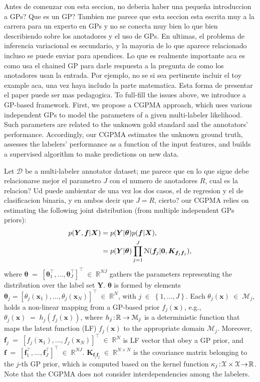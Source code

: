\documentclass[journal]{IEEEtran}
\providecommand{\ve}[1]{{\bm{#1}}}%
\providecommand{\mat}[1]{{\bm{#1}}} %
\newcommand{\Real}{\mathbb{R}}
\DeclareMathOperator{\en}{\!\,\in\!\,}
\DeclareMathOperator{\igual}{\!\,=\!\,}
\providecommand{\s}[1]{\negthinspace#1\negthinspace}%
\providecommand{\ve}[1]{{\mathbf{#1}}}
\providecommand{\mat}[1]{{\mathbf{#1}}}
\newcommand{\gauss}{\mathcal{N}} %
\newcommand{\comment}[2]{{\color{blue}#1} {\color{red}#2}}
\begin{document}
\comment{}{Antes de comenzar con esta seccion, no deberia haber una peque\~na introduccion a GPs? Que es un GP? Tambien me parece que esta seccion esta escrita muy a la carrera para un experto en GPs y no se conecta muy bien lo que bien describiendo sobre los anotadores y el uso de GPs. En ultimas, el problema de inferencia variacional es secundario, y la mayoria de lo que aparece relacionado incluso se puede enviar para apendices. Lo que es realmente importante aca es como usa el chained GP para darle respuesta a la pregunta de como los anotadores usan la entrada. Por ejemplo, no se si sea pertinente incluir el toy example aca, una vez haya includo la parte matematica. Esta forma de presentar el paper puede ser mas pedagogica.} To full-fill the issues above, we introduce a GP-based framework. First, we propose a CGPMA approach, which uses various independent GPs to model the parameters of a given multi-labeler likelihood. Such parameters are related to the unknown gold standard and the annotators' performance. Accordingly, our CGPMA estimates the unknown ground truth, assesses the labelers' performance as a function of the input features, and builds a supervised algorithm to make predictions on new data. 

\comment{Let $\mathcal{D}$ be a multi-labeler annotator dataset;}{me parece que en lo que sigue debe relacionarse mejor el parametro $J$ con el numero de anotadores $R$, cual es la relacion? Ud puede ambientar de una vez los dos casos, el de regresion y el de clasificacion binaria, y en ambos decir que $J=R$, cierto?} our CGPMA relies on estimating the following joint distribution (from multiple independent GPs priors):
\begin{align}
\notag p(\mat{Y},{\ve{f}}|\mat{X}) &= p(\mat{Y}|{\bm{\theta}})p({\ve{f}}|\mat{X}),\\
&= p(\mat{Y}|{\bm{\theta}})\prod_{j=1}^{J}\gauss(\ve{f}_j|\ve{0}, \mat{K}_{\ve{f}_j\ve{f}_j}),
\label{eq:Likelihood}
\end{align}
where ${\bm{\theta}} \igual \left[\bm{\theta}_1^{\top}, \dots , \bm{\theta}_J^{\top}\right]^{\top}\en \Real^{NJ}$ gathers the parameters representing the distribution over the label set $\mat{Y}$. ${\bm{\theta}}$ is formed by elements $\bm{\theta}_j = \left[\theta_j(\ve{x}_1), \dots , \theta_j(\ve{x}_N)\right]^{\top}\en \Real^{N}$, with $j\en \left\{1,\dots ,J \right\}$. Each $\theta_j(\ve{x}) \en \mathcal{M}_j$, holds a non-linear mapping from a GP-based prior $f_j (\ve{x})$, e.g., $\theta_j(\ve{x})\igual h_j(f_j(\ve{x}))$,
where $h_j\s{:}\Real\to \mathcal{M}_j$ is a deterministic function that maps the latent function (LF) $f_j(\ve{x})$ to the appropriate domain $\mathcal{M}_j$. Moreover, $\ve{f}_j\igual\left[f_j(\ve{x}_1), \dots , f_j(\ve{x}_N)\right]^{\top}\en \Real^{N}$ is LF vector that obey a GP prior, and ${\ve{f}} \igual \left[\ve{f}_1^{\top}, \dots , \ve{f}_J^{\top}\right]^{\top}\en \Real^{NJ}$. $\mat{K}_{\ve{f}_j\ve{f}_j} \en\Real^{N\times N}$ is the covariance matrix belonging to the $j$-th GP prior, which is computed based on the kernel function  $\kappa_j\s{:}\mathcal{X}\times\mathcal{X}\s{\to}\Real$. Note that the CGPMA does not consider interdependencies among the labelers. 
\end{document}
